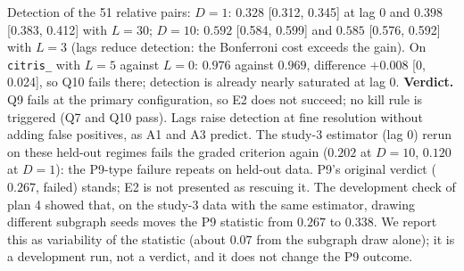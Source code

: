 Detection of the 51 relative pairs: $D=1$: $0.328$ [0.312, 0.345] at lag 0 and $0.398$ [0.383, 0.412] with $L=30$; $D=10$: $0.592$ [0.584, 0.599] and $0.585$ [0.576, 0.592] with $L=3$ (lags reduce detection: the Bonferroni cost exceeds the gain).
On \texttt{citris\_} with $L=5$ against $L=0$: $0.976$ against $0.969$, difference $+0.008$ [0, 0.024], so Q10 fails there; detection is already nearly saturated at lag 0.
\textbf{Verdict.} Q9 fails at the primary configuration, so E2 does not succeed; no kill rule is triggered (Q7 and Q10 pass). Lags raise detection at fine resolution without adding false positives, as A1 and A3 predict.
The study-3 estimator (lag 0) rerun on these held-out regimes fails the graded criterion again ($0.202$ at $D=10$, $0.120$ at $D=1$): the P9-type failure repeats on held-out data. P9's original verdict ($0.267$, failed) stands; E2 is not presented as rescuing it.
The development check of plan 4 showed that, on the study-3 data with the same estimator, drawing different subgraph seeds moves the P9 statistic from $0.267$ to $0.338$. We report this as variability of the statistic (about $0.07$ from the subgraph draw alone); it is a development run, not a verdict, and it does not change the P9 outcome.

